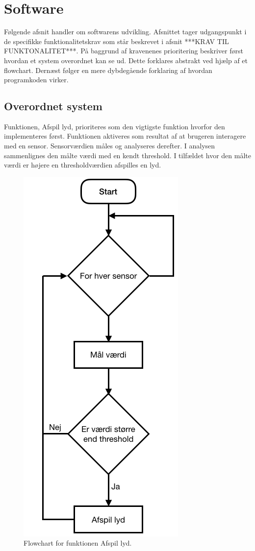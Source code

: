 \chapter{Software}
\label{software}
Følgende afsnit handler om softwarens udvikling. Afsnittet tager udgangspunkt i de specifikke funktionalitetskrav som står beskrevet i afsnit ***KRAV TIL FUNKTONALITET***. På baggrund af kravenenes prioritering beskriver først hvordan et system overordnet kan se ud. Dette forklares abstrakt ved hjælp af et flowchart. Dernæst følger en mere dybdegående forklaring af hvordan programkoden virker.

\section{Overordnet system}
Funktionen, Afspil lyd, prioriteres som den vigtigste funktion hvorfor den implementeres først. Funktionen aktiveres som resultat af at brugeren interagere med en sensor. Sensorværdien måles og analyseres derefter. I analysen sammenlignes den målte værdi med en kendt threshold. I tilfældet hvor den målte værdi er højere en thresholdværdien afspilles en lyd.  

\begin{figure}
\centering
\includegraphics[scale=0.4]{Figure/protoFlowChart01.png}
\caption{
Flowchart for funktionen Afspil lyd. }
\label{fig:protoFlowChart01.png}
\end{figure}

